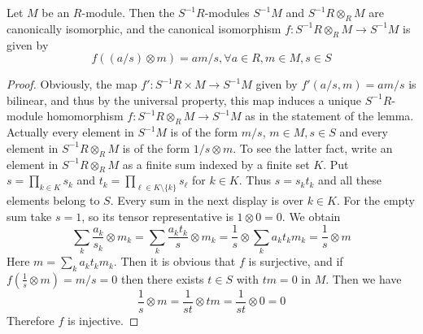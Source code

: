 \begin{lemma}
\label{editorial-source-lemma-tensor-localization}
Let $M$ be an $R$-module. Then the $S^{-1}R$-modules $S^{-1}M$
and $S^{-1}R \otimes_R M$ are canonically isomorphic, and the
canonical isomorphism $f : S^{-1}R \otimes_R M \to S^{-1}M$
is given by
$$
f((a/s) \otimes m) = am/s, \forall a \in R, m \in M, s \in S
$$
\end{lemma}

\begin{proof}
Obviously, the map
$f' : S^{-1}R \times M \to S^{-1}M$ given by $f'(a/s, m) = am/s$ is
bilinear, and thus by the
universal property, this map induces a unique $S^{-1}R$-module homomorphism
$f : S^{-1}R \otimes_R M \to S^{-1}M$ as in the statement of the lemma.
Actually every element in $S^{-1}M$ is of the form $m/s$, $m\in M, s\in S$ and
every element in
$S^{-1}R \otimes_R M$ is of the form $1/s \otimes m$. To see the latter fact,
write an element in $S^{-1}R\otimes_R M$ as a finite sum
indexed by a finite set $K$. Put
$s = \prod_{k\in K}s_k$ and
$t_k = \prod_{\ell\in K\setminus\{k\}}s_\ell$ for $k\in K$.
Thus $s=s_kt_k$ and all these elements belong to $S$.
Every sum in the next display is over $k\in K$.
For the empty sum take $s=1$, so its tensor representative is
$1\otimes 0=0$. We obtain
$$
\sum_k \frac{a_k}{s_k} \otimes m_k =
\sum_k \frac{a_k t_k}{s} \otimes m_k =
\frac{1}{s} \otimes \sum_k {a_k t_k}m_k = \frac{1}{s} \otimes m
$$
Here $m = \sum_k {a_k t_k}m_k$. Then it is obvious that $f$ is surjective,
and if $f(\frac{1}{s} \otimes m) = m/s = 0$ then there exists $t \in S$ with
$tm = 0$ in $M$. Then we have
$$
\frac{1}{s} \otimes m = \frac{1}{st} \otimes tm = \frac{1}{st} \otimes 0 = 0
$$
Therefore $f$ is injective.
\end{proof}